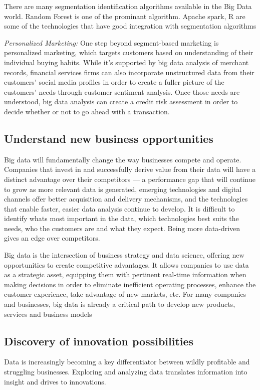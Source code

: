 \documentclass[sigconf]{acmart}
\begin{document}
There are many segmentation identification algorithms available in the Big Data world.  Random Forest is one of the prominant algorithm. Apache spark, R are some of the technologies that have good integration with segmentation algorithms

\textit{Personalized Marketing:} One step beyond segment-based marketing is personalized marketing, which targets customers based on understanding of their individual buying habits. While it’s  supported by big data analysis of merchant records, financial services firms can also incorporate unstructured data from their customers' social media profiles in order to create a fuller picture of the customers' needs through customer sentiment analysis. Once those needs are understood, big data analysis can create a credit risk assessment in order to decide whether or not to go ahead with a transaction.\cite{5-big-data-use-cases-in-banking-and-financial-services}

    
\subsection{Understand new business opportunities}
Big data will fundamentally change the way businesses
compete and operate. Companies that invest in and
successfully derive value from their data will have a distinct advantage over their competitors — a performance gap that will continue to grow as more relevant data is generated, emerging technologies and digital channels offer better acquisition and delivery mechanisms, and the technologies that enable faster, easier data analysis continue to develop. It is difficult to identify whats most important in the data, which technologies best suits the needs, who the customers are and what they expect. Being more data-driven gives an edge over competitors.\cite{bigdata-ey}

Big data is the intersection of business strategy and data science, offering new opportunities to create competitive advantages. It allows companies to use data as a strategic asset, equipping them with pertinent real-time information when making decisions in order to eliminate inefficient operating processes, enhance the customer experience, take advantage of new markets, etc.
For many companies and businesses, big data is already a critical path to develop new products, services and business models\cite{Accenture-Next-Generation-Financial}

\subsection{Discovery of innovation possibilities}
Data is increasingly becoming a key differentiator between wildly profitable and struggling businesses. Exploring and analyzing data translates information into insight and drives to innovations. \cite{bigdata-innovations}
\end{document}
